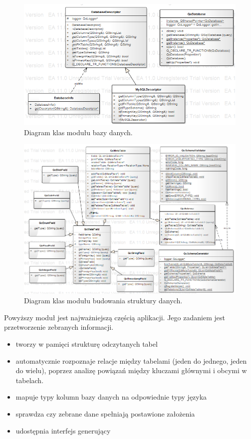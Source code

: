 \documentclass[12pt]{report}
\begin{document}
\begin{figure}[h]
	\centering
	\includegraphics[width=1\textwidth]{images/database.png}
	\caption{Diagram klas modułu bazy danych.}
\end{figure}
\FloatBarrier	

\begin{figure}[h]
	\centering
	\includegraphics[width=1\textwidth]{images/schema.png}
	\caption{Diagram klas modułu budowania struktury danych.}
\end{figure}
\FloatBarrier	

Powyższy moduł jest najważniejszą częścią aplikacji. Jego zadaniem jest przetworzenie zebranych informacji.
\begin{itemize}
\item{tworzy w pamięci strukturę odczytanych tabel}
\item{automatycznie rozpoznaje relacje między tabelami (jeden do jednego, jeden do wielu), poprzez analizę powiązań między kluczami głównymi i obcymi w tabelach.}
\item{mapuje typy kolumn bazy danych na odpowiednie typy języka}
\item{sprawdza czy zebrane dane spełniają postawione założenia}
\item{udostępnia interfejs generujący}
\end{itemize}
\end{document}
